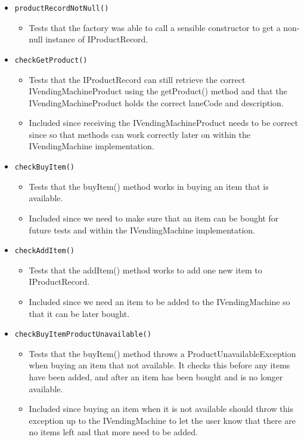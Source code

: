 \documentclass{article}
\begin{document}
\begin{itemize}

\item \verb+productRecordNotNull()+
\begin{itemize}
\item Tests that the factory was able to call a sensible constructor to get a non-null instance of IProductRecord.
\end{itemize}

\item \verb+checkGetProduct()+
\begin{itemize}
\item Tests that the IProductRecord can still retrieve the correct IVendingMachineProduct using the getProduct() method and that the IVendingMachineProduct holds the correct laneCode and description.
\item Included since receiving the IVendingMachineProduct needs to be correct since so that methods can work correctly later on within the IVendingMachine implementation.
\end{itemize}

\item \verb+checkBuyItem()+
\begin{itemize}
\item Tests that the buyItem() method works in buying an item that is available.
\item Included since we need to make sure that an item can be bought for future tests and within the IVendingMachine implementation.
\end{itemize}

\item \verb+checkAddItem()+
\begin{itemize}
\item Tests that the addItem() method works to add one new item to IProductRecord.
\item Included since we need an item to be added to the IVendingMachine so that it can be later bought.
\end{itemize}

\item \verb+checkBuyItemProductUnavailable()+
\begin{itemize}
\item Tests that the buyItem() method throws a ProductUnavailableException when buying an item that not available. It checks this before any items have been added, and after an item has been bought and is no longer available.
\item Included since buying an item when it is not available should throw this exception up to the IVendingMachine to let the user know that there are no items left and that more need to be added.
\end{itemize}


\end{itemize}
\end{document}
